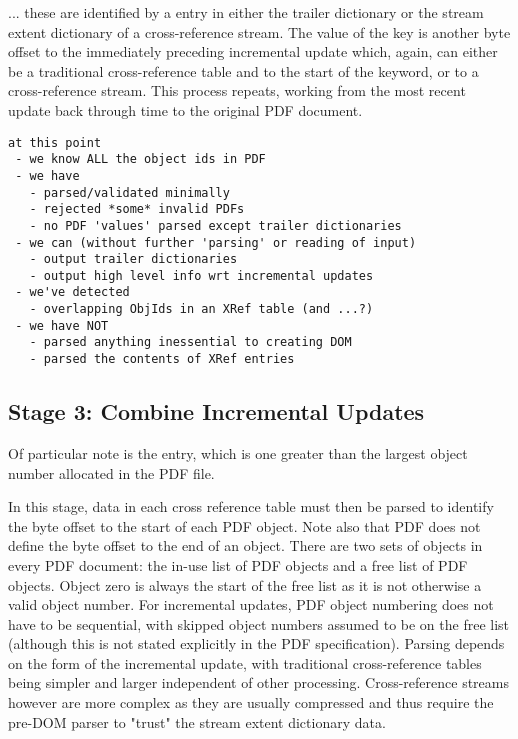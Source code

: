 ... these are identified by a  entry in either the trailer
dictionary or the stream extent dictionary of a cross-reference stream. The
value of the  key is another byte offset to the immediately
preceding incremental update which, again, can either be a traditional
cross-reference table and to the start of the  keyword, or to a
cross-reference stream. This process repeats, working from the most recent
update back through time to the original PDF document.

\begin{lstlisting}[style=meta]
at this point
 - we know ALL the object ids in PDF
 - we have
   - parsed/validated minimally
   - rejected *some* invalid PDFs
   - no PDF 'values' parsed except trailer dictionaries
 - we can (without further 'parsing' or reading of input)
   - output trailer dictionaries
   - output high level info wrt incremental updates
 - we've detected
   - overlapping ObjIds in an XRef table (and ...?)
 - we have NOT
   - parsed anything inessential to creating DOM
   - parsed the contents of XRef entries
\end{lstlisting}

\subsection{Stage 3: Combine Incremental Updates}

Of particular note is the  entry, which
is one greater than the largest object number allocated in the PDF
file.

In this stage, data in each cross reference table must then be parsed to
identify the byte offset to the start of each PDF object. Note also that PDF
does not define the byte offset to the end of an object. There are two sets of
objects in every PDF document: the in-use list of PDF objects and a free list
of PDF objects. Object zero is always the start of the free list as it is not
otherwise a valid object number. For incremental updates, PDF object numbering
does not have to be sequential, with skipped object numbers assumed to be on
the free list (although this is not stated explicitly in the PDF
specification). Parsing depends on the form of the incremental update, with
traditional cross-reference tables being simpler and larger independent of
other processing. Cross-reference streams however are more complex as they are
usually compressed and thus require the pre-DOM parser to "trust" the stream
extent dictionary data.

